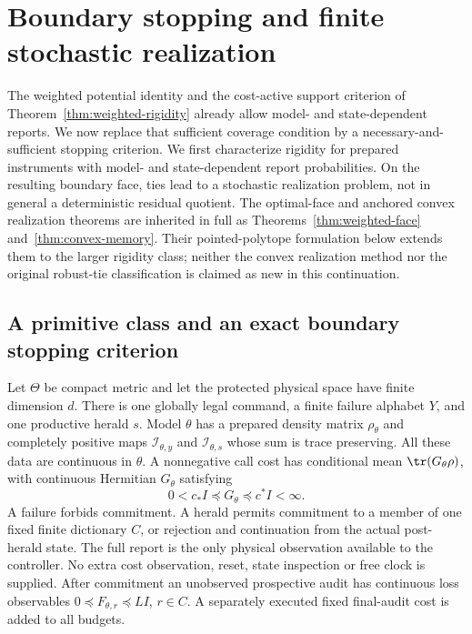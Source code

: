 \section{Boundary stopping and finite stochastic realization}\label{sec:stochastic-boundary}
The weighted potential identity and the cost-active support criterion of Theorem~\ref{thm:weighted-rigidity} already allow model- and state-dependent reports. We now replace that sufficient coverage condition by a necessary-and-sufficient stopping criterion. We first characterize rigidity for prepared instruments with model- and state-dependent report probabilities. On the resulting boundary face, ties lead to a stochastic realization problem, not in general a deterministic residual quotient. The optimal-face and anchored convex realization theorems are inherited in full as Theorems~\ref{thm:weighted-face} and~\ref{thm:convex-memory}. Their pointed-polytope formulation below extends them to the larger rigidity class; neither the convex realization method nor the original robust-tie classification is claimed as new in this continuation.

\subsection{A primitive class and an exact boundary stopping criterion}
Let $\Theta$ be compact metric and let the protected physical space have finite dimension $d$. There is one globally legal command, a finite failure alphabet $Y$, and one productive herald $s$. Model $\theta$ has a prepared density matrix $\rho_\theta$ and completely positive maps $\mathcal I_{\theta,y}$ and $\mathcal I_{\theta,s}$ whose sum is trace preserving. All these data are continuous in $\theta$. A nonnegative call cost has conditional mean $\tr(G_\theta\rho)$, with continuous Hermitian $G_\theta$ satisfying
\[
 0<c_*I\preccurlyeq G_\theta\preccurlyeq c^*I<\infty.
\]
A failure forbids commitment. A herald permits commitment to a member of one fixed finite dictionary $C$, or rejection and continuation from the actual post-herald state. The full report is the only physical observation available to the controller. No extra cost observation, reset, state inspection or free clock is supplied. After commitment an unobserved prospective audit has continuous loss observables $0\preccurlyeq F_{\theta,r}\preccurlyeq LI$, $r\in C$. A separately executed fixed final-audit cost is added to all budgets.

